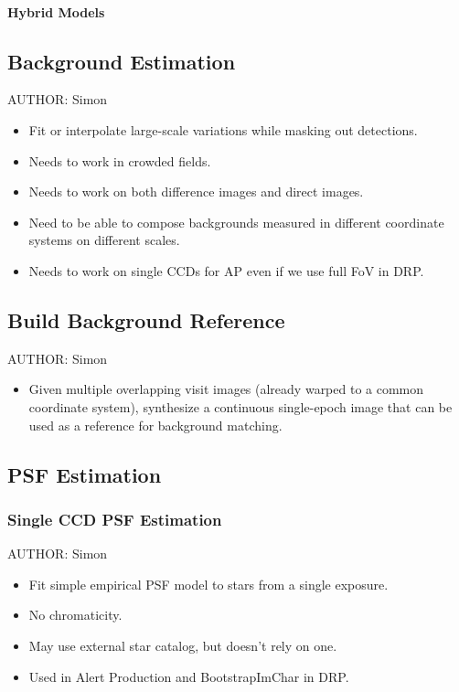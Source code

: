 \paragraph{Hybrid Models}
\label{sec:blending-hybrid-models}

\subsection{Background Estimation}
AUTHOR: Simon
\begin{itemize}
\item Fit or interpolate large-scale variations while masking out detections.
\item Needs to work in crowded fields.
\item Needs to work on both difference images and direct images.
\item Need to be able to compose backgrounds measured in different coordinate systems on different scales.
\item Needs to work on single CCDs for AP even if we use full FoV in DRP.
\end{itemize}

\subsection{Build Background Reference}
AUTHOR: Simon
\begin{itemize}
\item Given multiple overlapping visit images (already warped to a common coordinate system), synthesize a continuous single-epoch image that can be used as a reference for background matching.
\end{itemize}

\subsection{PSF Estimation}

\subsubsection{Single CCD PSF Estimation}
AUTHOR: Simon
\begin{itemize}
\item Fit simple empirical PSF model to stars from a single exposure.
\item No chromaticity.
\item May use external star catalog, but doesn't rely on one.
\item Used in Alert Production and BootstrapImChar in DRP.
\end{itemize}

